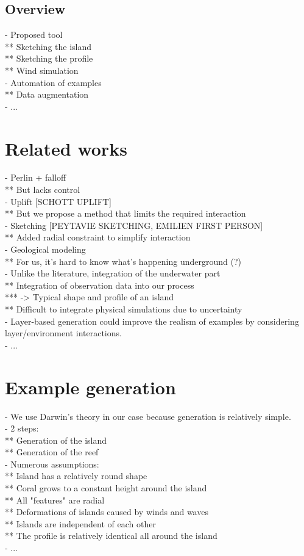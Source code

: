 \subsection{Overview}
- Proposed tool \\
** Sketching the island \\
** Sketching the profile \\
** Wind simulation \\
- Automation of examples \\
** Data augmentation \\
- ...

\section{Related works}
\label{sec:coral-island_related-works}
- Perlin + falloff \\
** But lacks control \\
- Uplift [SCHOTT UPLIFT] \cite{Cordonnier2016,Cordonnier2017a} \\
** But we propose a method that limits the required interaction \\
- Sketching [PEYTAVIE SKETCHING, EMILIEN FIRST PERSON] \cite{Gain2009} \\
** Added radial constraint to simplify interaction \\
- Geological modeling \cite{Patel2021} \\
** For us, it's hard to know what's happening underground (?) \\
- Unlike the literature, integration of the underwater part \\
** Integration of observation data into our process \\
*** -> Typical shape and profile of an island \\
** Difficult to integrate physical simulations due to uncertainty \\
- Layer-based generation could improve the realism of examples by considering layer/environment interactions. \\
- ...

\section{Example generation}
\label{sec:coral-island_example-generation}
- We use Darwin's theory in our case because generation is relatively simple. \\
- 2 steps: \\
** Generation of the island \\
** Generation of the reef \\
- Numerous assumptions: \\
** Island has a relatively round shape \\
** Coral grows to a constant height around the island \\
** All "features" are radial \\
** Deformations of islands caused by winds and waves \\
** Islands are independent of each other \\
** The profile is relatively identical all around the island \\
- ...

